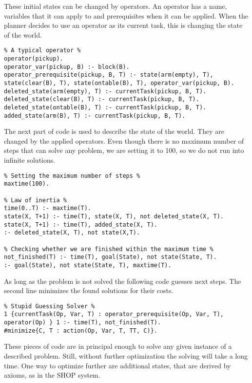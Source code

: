 \documentclass[10pt,a4paper]{article}
\begin{document}
These initial states can be changed by operators. An operator has a name, variables that it can apply to and prerequisites when it can be applied. When the planner decides to use an operator as its current task, this is changing the state of the world.

\begin{lstlisting}
% A typical operator %
operator(pickup).
operator_var(pickup, B) :- block(B).
operator_prerequisite(pickup, B, T) :- state(arm(empty), T), state(clear(B), T), state(ontable(B), T), operator_var(pickup, B).
deleted_state(arm(empty), T) :- currentTask(pickup, B, T).
deleted_state(clear(B), T) :- currentTask(pickup, B, T).
deleted_state(ontable(B), T) :- currentTask(pickup, B, T).
added_state(arm(B), T) :- currentTask(pickup, B, T).
\end{lstlisting}

The next part of code is used to describe the state of the world. They are changed by the applied operators. Even though there is no maximum number of steps that can solve any problem, we are setting it to 100, so we do not run into infinite solutions.

\begin{lstlisting}
% Setting the maximum number of steps %
maxtime(100).

% Law of inertia %
time(0..T) :- maxtime(T).
state(X, T+1) :- time(T), state(X, T), not deleted_state(X, T).
state(X, T+1) :- time(T), added_state(X, T).
:- deleted_state(X, T), not state(X,T).

% Checking whether we are finished within the maximum time %
not_finished(T) :- time(T), goal(State), not state(State, T).
:- goal(State), not state(State, T), maxtime(T).
\end{lstlisting}

As long as the problem is not solved the following code guesses next steps. The second line minimizes the found solutions for their costs.

\begin{lstlisting}
% Stupid Guessing Solver %
1 {currentTask(Op, Var, T) : operator_prerequisite(Op, Var, T), operator(Op) } 1 :- time(T), not_finished(T).
#minimize{C, T : action(Op, Var, T, TT, C)}.
\end{lstlisting}

These pieces of code are in principal enough to solve any given instance of a described problem. Still, without further optimization the solving will take a long time. One way to optimize further are additional states, that are derived by axioms, as in the SHOP system.
\end{document}
